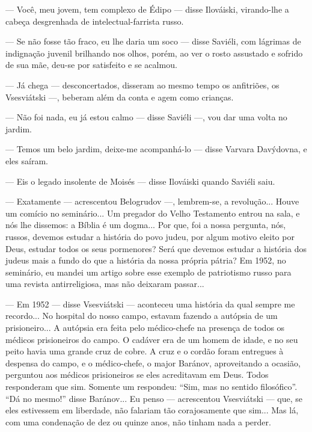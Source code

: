 --- Você, meu jovem, tem complexo de Édipo --- disse Ilováiski,
virando-lhe a cabeça desgrenhada de intelectual-farrista russo.

--- Se não fosse tão fraco, eu lhe daria um soco --- disse Saviéli, com
lágrimas de indignação juvenil brilhando nos olhos, porém, ao ver o
rosto assustado e sofrido de sua mãe, deu-se por satisfeito e se
acalmou.

--- Já chega --- desconcertados, disseram ao mesmo tempo os anfitriões,
os Vsesviátski ---, beberam além da conta e agem como crianças.

--- Não foi nada, eu já estou calmo --- disse Saviéli ---, vou dar uma
volta no jardim.

--- Temos um belo jardim, deixe-me acompanhá-lo --- disse Varvara
Davýdovna, e eles saíram.

--- Eis o legado insolente de Moisés --- disse Ilováiski quando Saviéli
saiu.

--- Exatamente --- acrescentou Belogrudov ---, lembrem-se, a
revolução... Houve um comício no seminário... Um pregador do Velho
Testamento entrou na sala, e nós lhe dissemos: a Bíblia é um dogma...
Por que, foi a nossa pergunta, nós, russos, devemos estudar a história
do povo judeu, por algum motivo eleito por Deus, estudar todos os seus
pormenores? Será que devemos estudar a história dos judeus mais a fundo
do que a história da nossa própria pátria? Em 1952, no seminário, eu
mandei um artigo sobre esse exemplo de patriotismo russo para uma
revista antirreligiosa, mas não deixaram passar...

--- Em 1952 --- disse Vsesviátski --- aconteceu uma história da qual
sempre me recordo... No hospital do nosso campo, estavam fazendo a
autópsia de um prisioneiro... A autópsia era feita pelo médico-chefe na
presença de todos os médicos prisioneiros do campo. O cadáver era de um
homem de idade, e no seu peito havia uma grande cruz de cobre. A cruz e
o cordão foram entregues à despensa do campo, e o médico-chefe, o major
Baránov, aproveitando a ocasião, perguntou aos médicos prisioneiros se
eles acreditavam em Deus. Todos responderam que sim. Somente um
respondeu: ``Sim, mas no sentido filosófico''. ``Dá no mesmo!'' disse
Baránov... Eu penso --- acrescentou Vsesviátski --- que, se eles
estivessem em liberdade, não falariam tão corajosamente que sim... Mas
lá, com uma condenação de dez ou quinze anos, não tinham nada a perder.

